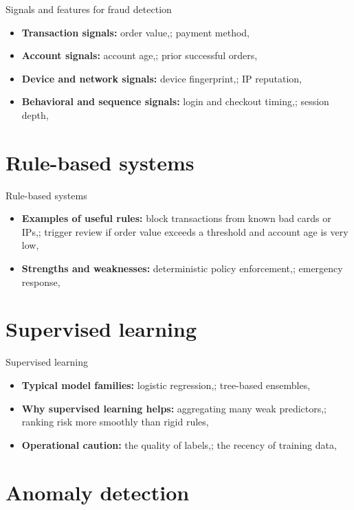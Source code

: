 \documentclass[aspectratio=169]{beamer}
\begin{document}
\begin{frame}{Signals and features for fraud detection}
  \begin{itemize}
    \item \textbf{Transaction signals:} order value,; payment method,
    \item \textbf{Account signals:} account age,; prior successful orders,
    \item \textbf{Device and network signals:} device fingerprint,; IP reputation,
    \item \textbf{Behavioral and sequence signals:} login and checkout timing,; session depth,
  \end{itemize}
\end{frame}

\section{Rule-based systems}

\begin{frame}{Rule-based systems}
  \begin{itemize}
    \item \textbf{Examples of useful rules:} block transactions from known bad cards or IPs,; trigger review if order value exceeds a threshold and account age is very low,
    \item \textbf{Strengths and weaknesses:} deterministic policy enforcement,; emergency response,
  \end{itemize}
\end{frame}

\section{Supervised learning}

\begin{frame}{Supervised learning}
  \begin{itemize}
    \item \textbf{Typical model families:} logistic regression,; tree-based ensembles,
    \item \textbf{Why supervised learning helps:} aggregating many weak predictors,; ranking risk more smoothly than rigid rules,
    \item \textbf{Operational caution:} the quality of labels,; the recency of training data,
  \end{itemize}
\end{frame}

\section{Anomaly detection}
\end{document}
